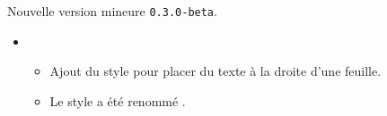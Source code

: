Nouvelle version mineure \verb+0.3.0-beta+.

\begin{itemize}[itemsep=.5em]
    \item {}
    \begin{itemize}[itemsep=.5em]
        \item Ajout du style  pour placer du texte à la droite d'une feuille.

        \item Le style  a été renommé .
    \end{itemize}
\end{itemize}

\separation